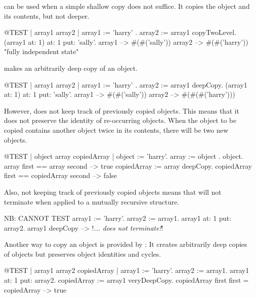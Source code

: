 \documentclass[a4paper,10pt,twoside]{book}
\begin{document}
 can be used when a simple shallow copy does not suffice. It copies the object and its contents, but not deeper.

\begin{code}{@TEST | array1 array2 |}
array1 := { { 'harry' } }.
array2 := array1 copyTwoLevel.
(array1 at: 1) at: 1 put: 'sally'.
array1 --> #(#('sally'))
array2 --> #(#('harry'))    "fully independent state"
\end{code}

 makes an arbitrarily deep copy of an object.

\begin{code}{@TEST | array1 array2 |}
array1 := { { { 'harry' } } }.
array2 := array1 deepCopy.
(array1 at: 1) at: 1 put: 'sally'.
array1 --> #(#('sally'))
array2 --> #(#(#('harry')))
\end{code}

However,  does not keep track of previously copied objects. This means that it does not preserve the identity of re-occurring objects. When the object to be copied contains another object twice in its contents, there will be two new objects.

\begin{code}{@TEST | object array copiedArray |}
object := {'harry'}.
array := {object . object}.
array first == array second --> true
copiedArray := array deepCopy.
copiedArray first == copiedArray second --> false
\end{code}

Also, not keeping track of previously copied objects means that  will not terminate when applied to a mutually recursive structure.

\begin{code}{NB: CANNOT TEST}
array1 := {'harry'}.
array2 := {array1}.
array1 at: 1 put: array2.
array1 deepCopy --> !\emph{... does not terminate!}!
\end{code}

Another way to copy an object is provided by :
It creates arbitrarily deep copies of objects but preserves object identities and cycles.

\begin{code}{@TEST | array1 array2 copiedArray |}
array1 := {'harry'}.
array2 := {array1}.
array1 at: 1 put: array2.
copiedArray := array1 veryDeepCopy.
copiedArray first first = copiedArray --> true
\end{code}
\end{document}
